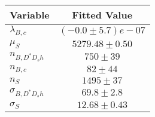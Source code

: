 \begin{tabular}[t]{lc}
\hline
Variable &Fitted Value\\
\hline\hline
$\lambda_{B,c}$&$(-0.0\pm5.7)e-07$\\
\hline
$\mu_S$&$5279.48\pm0.50$\\
\hline
$n_{B, D^* D_s h}$&$750\pm39$\\
\hline
$n_{B,c}$&$82\pm44$\\
\hline
$n_S$&$1495\pm37$\\
\hline
$\sigma_{B, D^* D_s h}$&$69.8\pm2.8$\\
\hline
$\sigma_S$&$12.68\pm0.43$\\
\hline
\end{tabular}